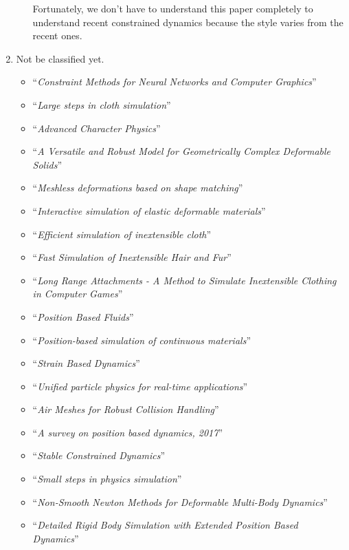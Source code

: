 \documentclass[pdflatex,sn-mathphys-num]{sn-jnl}%
\theoremstyle{thmstyleone}%
\theoremstyle{thmstyletwo}%
\theoremstyle{thmstylethree}%
\newcommand{\pname}[1]{``{\sl #1}''}
\begin{document}
\begin{enumerate}
\begin{itemize}
		Fortunately, we don't have to understand this paper completely to understand recent constrained dynamics because the style varies from the recent ones.
		\end{itemize}
	\item Not be classified yet.
		\begin{itemize}
			\item \pname{Constraint Methods for Neural Networks and Computer Graphics}\cite{ConstrainedPlatt}
			\item \pname{Large steps in cloth simulation}\cite{LargeStepBaraff}
			\item \pname{Advanced Character Physics}\cite{Jakobsen2003AdvancedCP}
			\item \pname{A Versatile and Robust Model for Geometrically Complex Deformable Solids}\cite{VersatileTeschner}
			\item \pname{Meshless deformations based on shape matching}\cite{MeshlessMuller2005}
			\item \pname{Interactive simulation of elastic deformable materials}\cite{Servin2006InteractiveSO}
			\item \pname{Efficient simulation of inextensible cloth}\cite{EfficientGoldenthai}
			\item \pname{Fast Simulation of Inextensible Hair and Fur}\cite{InextensibleHair}
			\item \pname{Long Range Attachments - A Method to Simulate Inextensible Clothing in Computer Games}\cite{LongRangeAttachments}
			\item \pname{Position Based Fluids}\cite{PosBaseFluids}
			\item \pname{Position-based simulation of continuous materials}\cite{PBContimuousBENDER2014}
			\item \pname{Strain Based Dynamics}\cite{StrainBasedDyn}
			\item \pname{Unified particle physics for real-time applications}\cite{UnifiedParticle}
			\item \pname{Air Meshes for Robust Collision Handling}\cite{AirMesh}
			\item \pname{A survey on position based dynamics, 2017}\cite{PBDCoursenote}
			\item \pname{Stable Constrained Dynamics}\cite{StableConstrainedDyn}
			\item \pname{Small steps in physics simulation}\cite{SmallSteps}
			\item \pname{Non-Smooth Newton Methods for Deformable Multi-Body Dynamics}\cite{NonSmooth}
			\item \pname{Detailed Rigid Body Simulation with Extended Position Based Dynamics}\cite{DetailedRigidbody}

\end{itemize}
\end{enumerate}
\end{document}
